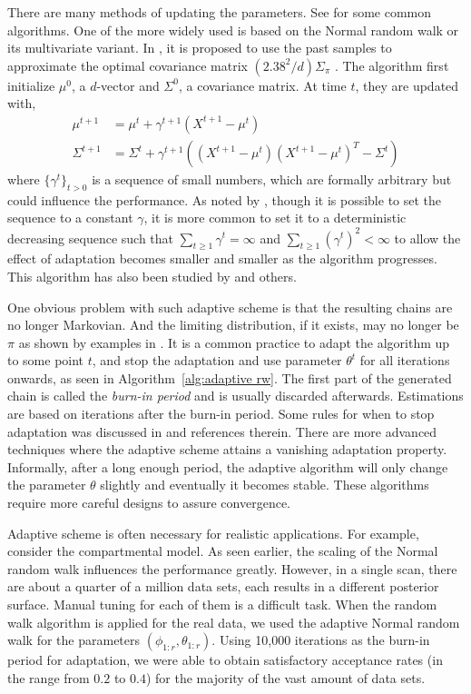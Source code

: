 There are many methods of updating the parameters. See \cite{Andrieu:2008kh}
for some common algorithms. One of the more widely used is based on the
Normal random walk or its multivariate variant. In
\cite{Haario:1999dh,Haario:2001gu}, it is proposed to use the past samples to
approximate the optimal covariance matrix $(2.38^2/d)\Sigma_{\pi}$
\cite{Gelman:1995vx}. The algorithm first initialize $\mu^0$, a $d$-vector
and $\Sigma^0$, a covariance matrix. At time $t$, they are updated with,
\begin{align}
  \mu^{t+1} &= \mu^t + \gamma^{t+1} (X^{t+1} - \mu^t) \\
  \Sigma^{t+1} &= \Sigma^t + \gamma^{t+1}((X^{t+1} - \mu^t)(X^{t+1} - \mu^t)^T
  - \Sigma^t)
\end{align}
where $\{\gamma^t\}_{t>0}$ is a sequence of small numbers, which are formally
arbitrary but could influence the performance. As noted by
\cite{Andrieu:2008kh}, though it is possible to set the sequence to a
constant $\gamma$, it is more common to set it to a deterministic decreasing
sequence such that $\sum_{t\ge1}\gamma^t = \infty$ and
$\sum_{t\ge1}(\gamma^t)^2<\infty$ to allow the effect of adaptation becomes
smaller and smaller as the algorithm progresses. This algorithm has also been
studied by \cite{Andrieu:2006tw} and others.

One obvious problem with such adaptive scheme is that the resulting chains
are no longer Markovian. And the limiting distribution, if it exists, may no
longer be $\pi$ as shown by examples in \cite{Andrieu:2008kh}. It is a common
practice to adapt the algorithm up to some point $t$, and stop the adaptation
and use parameter $\theta^t$ for all iterations onwards, as seen in
Algorithm~\ref{alg:adaptive rw}. The first part of the generated chain is
called the \emph{burn-in period} and is usually discarded afterwards.
Estimations are based on iterations after the burn-in period. Some rules for
when to stop adaptation was discussed in \cite{Andrieu:2008kh} and references
therein. There are more advanced techniques where the adaptive scheme attains
a vanishing adaptation property. Informally, after a long enough period, the
adaptive algorithm will only change the parameter $\theta$ slightly and
eventually it becomes stable. These algorithms require more careful designs
to assure convergence.

Adaptive scheme is often necessary for realistic applications. For example,
consider the \pet compartmental model. As seen earlier, the scaling of the
Normal random walk influences the performance greatly. However, in a single
\pet scan, there are about a quarter of a million data sets, each results in
a different posterior surface. Manual tuning for each of them is a difficult
task. When the random walk algorithm is applied for the real data, we used
the adaptive Normal random walk for the parameters
$(\phi_{1:r},\theta_{1:r})$. Using 10,000 iterations as the burn-in period
for adaptation, we were able to obtain satisfactory acceptance rates (in the
range from $0.2$ to $0.4$) for the majority of the vast amount of data sets.

